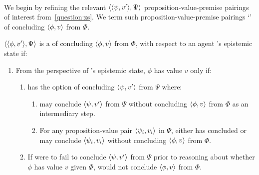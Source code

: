 \paragraph*{}

\begin{note}
  We begin by refining the relevant \(\langle \langle \psi, v' \rangle, \Psi \rangle\) proposition-value-premise pairings of interest from~\autoref{question:zs}.
  We term such proposition-value-premise pairings `' of concluding \(\langle \phi, v \rangle\) from \(\Phi\).
\end{note}

\begin{note}
  \begin{notion}[\requ{3}]
    \label{notion:overview:requ}
    \(\langle \langle \phi, v' \rangle, \Psi \rangle\) is a \requ{} of concluding \(\langle \phi, v \rangle\) from \(\Phi\), with respect to an agent \vAgent{}'s epistemic state if:
    \begin{enumerate}
    \item
      \label{notion:overview:requ:main}
      From the perspective of \vAgent{}'s epistemic state, \(\phi\) has value \(v\) only if:
      \begin{enumerate}[label=\alph*., ref=\named{R:\alph*}]
      \item
        \label{notion:overview:requ:pool}
        \vAgent{} has the option of concluding \(\langle \psi, v' \rangle\) from \(\Psi\) where:
        \begin{enumerate}[label=\roman*., ref=\named{R:a.\roman*}, series=csIdeaCounter]
        \item
          \label{notion:overview:requ:pool:int}
          \vAgent{} may conclude \(\langle \psi, v' \rangle\) from \(\Psi\) without concluding \(\langle \phi, v \rangle\) from \(\Phi\) as an intermediary step.
        \item
          \label{notion:overview:requ:pool:ind}
          For any proposition-value pair \(\langle \psi_{i}, v_{i} \rangle\) in \(\Psi\), \vAgent{} either has concluded or may conclude \(\langle \psi_{i}, v_{i} \rangle\) without concluding \(\langle \phi, v \rangle\) from \(\Phi\).
        \end{enumerate}
      \item
        \label{notion:overview:requ:nPsi-nPhi}
        If \vAgent{} were to fail to conclude \(\langle \psi, v' \rangle\) from \(\Psi\) prior to reasoning about whether \(\phi\) has value \(v\) given \(\Phi\), \vAgent{} would not conclude \(\langle \phi, v \rangle\) from \(\Phi\).
      \end{enumerate}
    \end{enumerate}
    \vspace{-\baselineskip}
  \end{notion}


\end{note}

